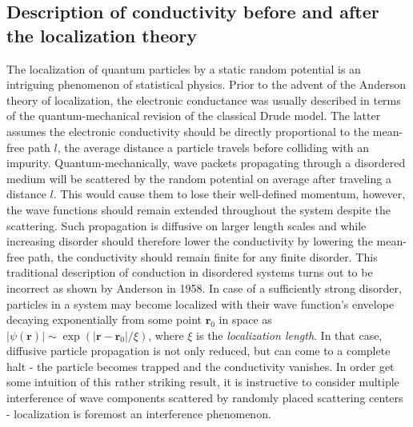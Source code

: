 \documentclass[10pt,a4paper]{article}
\begin{document}
\subsection{Description of conductivity before and after the localization theory }
The localization of quantum particles by a static random potential is an intriguing phenomenon of statistical physics. Prior to the advent of the Anderson theory of localization, the electronic conductance was usually described in terms of the quantum-mechanical revision of the classical Drude model. The latter assumes the electronic conductivity should be directly proportional to the mean-free path $l$, the average distance a particle travels before colliding with an impurity. Quantum-mechanically, wave packets propagating through a disordered medium will be scattered by the random potential on average after traveling a distance $l$. This would cause them to lose their well-defined momentum, however, the wave functions should remain extended throughout the system despite the scattering. Such propagation is diffusive on larger length scales and while increasing disorder should therefore lower the conductivity by lowering the mean-free path, the conductivity should remain finite for any finite disorder. This traditional description of conduction in disordered systems turns out to be incorrect as shown by Anderson in 1958. In case of a sufficiently strong disorder, particles in a system may become localized with their wave function's envelope decaying exponentially from some point $\mathbf{r}_0$ in space as $|\psi(\mathbf{r})| \sim \exp\left(|\mathbf{r} - \mathbf{r}_0 |/\xi \right)$, where $\xi$ is the \emph{localization length}. In that case, diffusive particle propagation is not only reduced, but can come to a complete halt - the particle becomes trapped and the conductivity vanishes. In order get some intuition of this rather striking result, it is instructive to consider multiple interference of wave components scattered by randomly placed scattering centers - localization is foremost an interference phenomenon.
\end{document}
